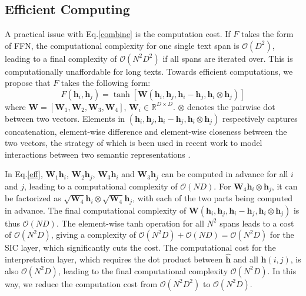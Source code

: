 \documentclass[11pt,a4paper]{article}
\begin{document}
\subsection{Efficient Computing}
\label{F}
A practical issue with Eq.\ref{combine} is the computation cost. If $F$ takes the form of FFN, the computational complexity for one single text span is $\mathcal{O}(D^2)$, 
leading to a final complexity of $\mathcal{O}(N^2D^2)$ if all spans are iterated over. This  is   computationally unaffordable for long texts. 
Towards efficient computations, we propose that $F$ takes the following form:
\begin{equation}
F(\bm{h}_i, \bm{h}_j) = \tanh[ \bm{W}(\bm{h}_i, \bm{h}_j, \bm{h}_i - \bm{h}_j, \bm{h}_i \otimes \bm{h}_j)]
\label{eff}
\end{equation}
where $\bm{W}= [\bm{W}_1, \bm{W}_2, \bm{W}_3, \bm{W}_4]$, $\bm{W}_i\in\mathbb{R}^{D\times D}$. $\otimes$ denotes the pairwise dot between two vectors. Elements in 
$(\bm{h}_i, \bm{h}_j, \bm{h}_i - \bm{h}_j, \bm{h}_i \otimes \bm{h}_j)$ respectively captures concatenation, element-wise difference and element-wise closeness between the two vectors, the strategy of which is been used in recent work to model interactions between two semantic representations \cite{mou2015natural,seo2016bidirectional}.

In Eq.\ref{eff}, $\bm{W}_1 \bm{h}_i$, $\bm{W}_2 \bm{h}_j$, $\bm{W}_3 \bm{h}_i$ and $\bm{W}_3 \bm{h}_j$ can be computed in advance for all $i$ and $j$, leading to a computational complexity of $\mathcal{O}(ND)$. 
For $\bm{W}_4 \bm{h}_i \otimes \bm{h}_j$, it can be factorized as $\sqrt{\bm{W}_4}\bm{h}_i \otimes \sqrt{\bm{W}_4}\bm{h}_j$, with each of the two parts being computed in advance. 
 The final computational complexity of $\bm{W}(\bm{h}_i, \bm{h}_j, \bm{h}_i - \bm{h}_j, \bm{h}_i \otimes \bm{h}_j)$ is thus $\mathcal{O}(ND)$. The element-wise tanh operation for all $N^2$ spans leads to a cost of $\mathcal{O}(N^2D)$, giving a complexity of $\mathcal{O}(N^2D)+ \mathcal{O}(ND) =\mathcal{O}(N^2D)$ for  the SIC layer, which significantly cuts the cost.
 The computational cost for the interpretation layer, which requires the dot product between $\hat{\bm{h}}$ and all $\bm{h}(i,j)$, is also $\mathcal{O}(N^2D)$,
 leading to the final  computational complexity $\mathcal{O}(N^2D)$. 
In this way, we reduce the computation cost from $\mathcal{O}(N^2D^2)$ to $\mathcal{O}(N^2D)$. 
\end{document}
